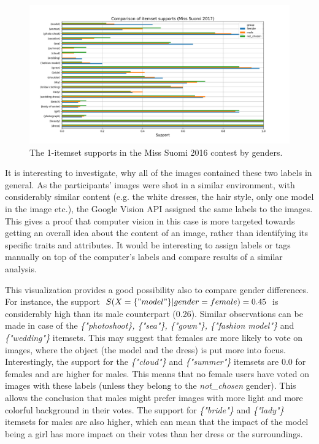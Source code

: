 \begin{figure}[h] 
    \begin{center}
        \includegraphics[width=1.0\textwidth]{Images/itemset_supports-gender-Miss_Helsinki-1_itemset.png}
        \caption{The 1-itemset supports in the Miss Suomi 2016 contest by genders.}
        \label{itemset_supports-gender-Miss_Helsinki-1_itemset}
    \end{center}
\end{figure}

It is interesting to investigate, why all of the images contained these two labels in general. As the participants' images were shot in a similar environment, with considerably similar content (e.g. the white dresses, the hair style, only one model in the image etc.), the Google Vision API assigned the same labels to the images. This gives a proof that computer vision in this case is more targeted towards getting an overall idea about the content of an image, rather than identifying its specific traits and attributes. It would be interesting to assign labels or tags manually on top of the computer's labels and compare results of a similar analysis.

This visualization provides a good possibility also to compare gender differences. For instance, the support $S(X=\{"model"\}|gender=female)=0.45$ is considerably high than its male counterpart (0.26). Similar observations can be made in case of the \emph{\{"photo\:shoot\}, \{"sea"\}, \{"gown"\}, \{"fashion model"\}} and \emph{\{"wedding"\}} itemsets. This may suggest that females are more likely to vote on images, where the object (the model and the dress) is put more into focus. Interestingly, the support for the \emph{\{"cloud"\}} and \emph{\{"summer"\}} itemsets are 0.0 for females and are higher for males. This means that no female users have voted on images with these labels (unless they belong to the \emph{not\_chosen} gender). This allows the conclusion that males might prefer images with more light and more colorful background in their votes. The support for \emph{\{"bride"\}} and \emph{\{"lady"\}} itemsets for males are also higher, which can mean that the impact of the model being a girl has more impact on their votes than her dress or the surroundings.

